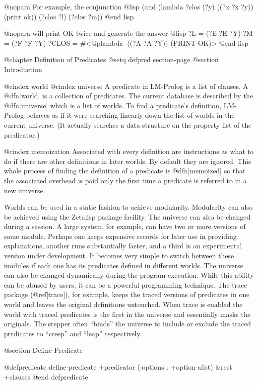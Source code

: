 {@nopara
For example, the conjunction
@lisp
(and (lambda ?clos (?y) ((?x ?x ?y)) (print ok))
     (?clos ?l)
     (?clos ?m))
@end lisp

@nopara
will print OK twice and generate the answer
@lisp
?L = (?E ?E ?Y)
?M = (?F ?F ?Y)
?CLOS = #<@plambda ((?A ?A ?Y)) (PRINT OK)>
@end lisp


@chapter Definition of Predicates
@setq defpred section-page
@section Introduction

@cindex world
@cindex universe
A predicate in LM-Prolog is a list of clauses.
A @dfn[world] is a collection of predicates.
The current database is described by the @dfn[universe]
which is a list of worlds.
To find a predicate's definition, LM-Prolog behaves as if it were 
searching linearly down the list of worlds in the current universe.
(It actually searches a data structure on the property list of the
predicator.)

@cindex memoization
Associated with every definition are instructions as what to do if there are
other definitions in later worlds.
By default they are ignored.
This whole process of finding the definition of a predicate is @dfn[memoized]
so that the associated overhead is paid only the first time a predicate is
referred to in a new universe.

Worlds can be used in a static fashion to achieve modularity.
Modularity can also be achieved using the Zetalisp package facility.
The universe can also be changed during a session.  A large system,
for example, can have two or more versions of some module.  Perhaps
one keeps expensive records for later use in providing explanations,
another runs substantially faster, and a third is an experimental
version under development.  It becomes very simple to switch between
these modules if each one has its predicates defined in different
worlds.  The universe can also be changed dynamically during the
program execution.  While this ability can be abused by users, it can
be a powerful programming technique.  The trace package (@ref[trace]),
for example, keeps the traced versions of predicates in one world and
leaves the original definitions untouched.  When trace is enabled the
world with traced predicates is the first in the universe and
essentially masks the originals.  The stepper often ``binds'' the
universe to include or exclude the traced predicates to ``creep'' and
``leap'' respectively.

@section Define-Predicate

@defpredicate define-predicate +predicator (:options . +option-alist) &rest +clauses
@end defpredicate

}
